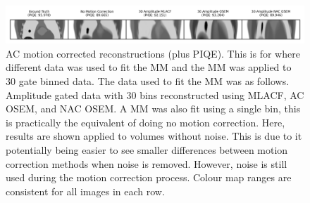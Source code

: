             \begin{figure}
                \centering
                
                \includegraphics[width=1.0\linewidth]{figures/motion_correction_2_results_2_noiseless_30_amplitude_visual_analysis.png}
                
                \captionsetup{singlelinecheck=false}
                \caption{
                    \gls{AC} motion corrected reconstructions (plus \gls{PIQE}). This is for where different data was used to fit the \gls{MM} and the \gls{MM} was applied to $30$ gate binned data. The data used to fit the \gls{MM} was as follows. Amplitude gated data with $30$ bins reconstructed using \gls{MLACF}, \gls{AC} \gls{OSEM}, and \gls{NAC} \gls{OSEM}. A \gls{MM} was also fit using a single bin, this is practically the equivalent of doing no motion correction. Here, results are shown applied to volumes without noise. This is due to it potentially being easier to see smaller differences between motion correction methods when noise is removed. However, noise is still used during the motion correction process. Colour map ranges are consistent for all images in each row.
                }
                
                \label{fig:evaluation_of_pet_ct_motion_correction_incorporating_motion_models_using_mlacf_and_complex_gating_schemes_results_noiseless_30_amplitude_visual_analysis}
            \end{figure}

